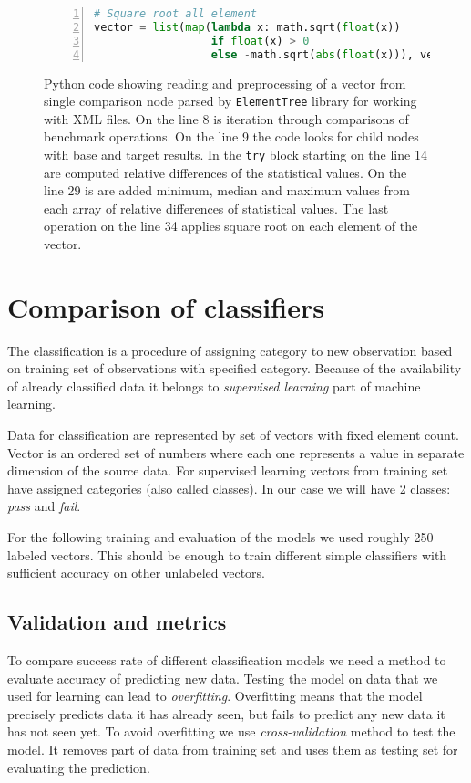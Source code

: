 \begin{figure}
\begin{lstlisting}[language=Python, numbers=left]
# Square root all element
vector = list(map(lambda x: math.sqrt(float(x))
                  if float(x) > 0
                  else -math.sqrt(abs(float(x))), vector)))
  \end{lstlisting}
  \normalsize
  \caption{Python code showing reading and preprocessing of a vector from single
    comparison node parsed by \texttt{ElementTree} library for working with XML
    files. On the line 8 is iteration through comparisons of benchmark
    operations. On the line 9 the code looks for child nodes with base and
    target results. In the \texttt{try} block starting on the line 14 are
    computed relative differences of the statistical values. On the line 29 is
    are added minimum, median and maximum values from each array of relative
    differences of statistical values. The last operation on the line 34 applies
    square root on each element of the vector.}
  \label{fig:learn_preprocess}
\end{figure}

\section{Comparison of classifiers} \label{sec:classifier_comparison}
The classification is a procedure of assigning category to new observation based on
training set of observations with specified category. Because of the
availability of already classified data it belongs to \emph{supervised learning}
part of machine learning.

Data for classification are represented by set of vectors with fixed element
count. Vector is an ordered set of numbers where each one represents a value in
separate dimension of the source data. For supervised learning vectors from
training set have assigned categories (also called classes). In our case we will have
2 classes: \emph{pass} and \emph{fail}.

For the following training and evaluation of the models we used roughly 250
labeled vectors. This should be enough to train different simple classifiers with
sufficient accuracy on other unlabeled vectors.

\subsection{Validation and metrics} \label{subsec:validation}
To compare success rate of different classification models we need a method to evaluate
accuracy of predicting new data. Testing the model on data that we used for
learning can lead to \emph{overfitting}. Overfitting means that the model
precisely predicts data it has already seen, but fails to predict any new data
it has not seen yet.
To avoid overfitting we use \emph{cross-validation} method to test the model.
It removes part of data from training set and uses them as testing set for
evaluating the prediction.

